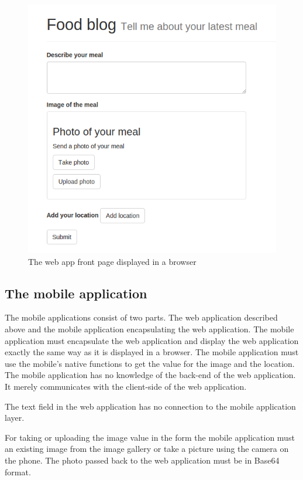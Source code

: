 \begin{figure}[h!]
	\centering
    \includegraphics[width=120mm,natwidth=800,natheight=600]{./img/webAppFrontPage.png}
    \caption{The web app front page displayed in a browser}
    \label{fig:nativeuml}
\end{figure}

\subsection{The mobile application} \label{subsection-mobile-application}
The mobile applications consist of two parts. The web application described above and the mobile application encapsulating the web application. The mobile application must encapsulate the web application and display the web application exactly the same way as it is displayed in a browser. The mobile application must use the mobile’s native functions to get the value for the image and the location. The mobile application has no knowledge of the back-end of the web application. It merely communicates with the client-side of the web application.

The text field in the web application has no connection to the mobile application layer. 

For taking or uploading the image value in the form the mobile application must an existing image from the image gallery or take a picture using the camera on the phone. The photo passed back to the web application must be in Base64 format. 

